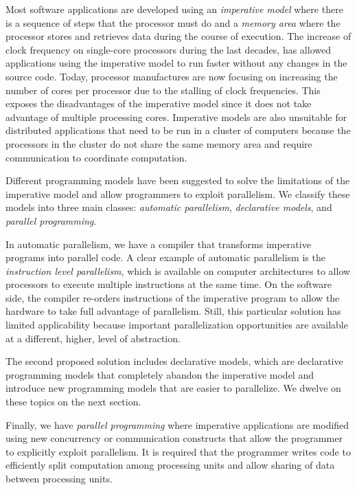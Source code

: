 Most software applications are developed using an \emph{imperative model} where
there is a sequence of steps that the processor must do and a \emph{memory area}
where the processor stores and retrieves data during the course of execution.
The increase of clock frequency on single-core processors during the last
decades, has allowed applications using the imperative model to run faster
without any changes in the source code. Today, processor manufactures are now
focusing on increasing the number of cores per processor due to the stalling of
clock frequencies. This exposes the disadvantages of the imperative model since
it does not take advantage of multiple processing cores. Imperative models are
also unsuitable for distributed applications that need to be run in a cluster of
computers because the processors in the cluster do not share the same memory
area and require communication to coordinate computation.

Different programming models have been suggested to solve the limitations of the
imperative model and allow programmers to exploit parallelism. We classify these
models into three main classes: \emph{automatic parallelism}, \emph{declarative models}, and
\emph{parallel programming}.

In automatic parallelism, we have a compiler that transforms imperative programs
into parallel code. A clear example of automatic parallelism is the
\emph{instruction level parallelism}, which is available on computer
architectures to allow processors to execute multiple instructions at the same
time. On the software side, the compiler re-orders instructions of the
imperative program to allow the hardware to take full advantage of parallelism.
Still, this particular solution has limited applicability because important
parallelization opportunities are available at a different, higher, level of abstraction.

The second proposed solution includes declarative models, which are declarative
programming models that completely abandon the imperative model and introduce
new programming models that are easier to parallelize. We dwelve on these topics
on the next section.

Finally, we have \emph{parallel programming} where imperative applications are
modified using new concurrency or communication constructs that allow the
programmer to explicitly exploit parallelism. It is required that the programmer
writes code to efficiently split computation among processing units and allow
sharing of data between processing units.

